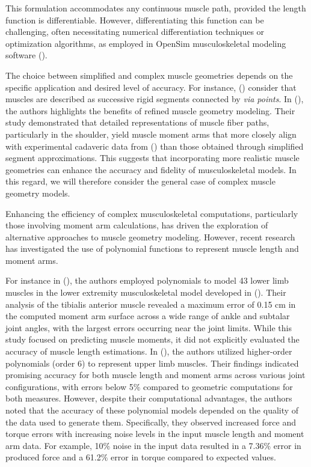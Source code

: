 This formulation accommodates any continuous muscle path, provided the length function is differentiable. However, differentiating this function can be challenging, often necessitating numerical differentiation techniques or optimization algorithms, as employed in OpenSim musculoskeletal modeling software (\cite{delpOpenSimOpenSourceSoftware2007}).

The choice between simplified and complex muscle geometries depends on the specific application and desired level of accuracy. For instance, (\cite{livetAutomaticSimplifiedApproach2022}) consider that muscles are described as successive rigid segments connected by \emph{via points}. In (\cite{kedadriaShoulderMusculoskeletalModel2023}), the authors highlights the benefits of refined muscle geometry modeling. Their study demonstrated that detailed representations of muscle fiber paths, particularly in the shoulder, yield muscle moment arms that more closely align with experimental cadaveric data from (\cite{acklandMomentArmsMuscles2008}) than those obtained through simplified segment approximations. This suggests that incorporating more realistic muscle geometries can enhance the accuracy and fidelity of musculoskeletal models. In this regard, we will therefore consider the general case of complex muscle geometry models.

Enhancing the efficiency of complex musculoskeletal computations, particularly those involving moment arm calculations, has driven the exploration of alternative approaches to muscle geometry modeling. However, recent research has investigated the use of polynomial functions to represent muscle length and moment arms.

For instance in (\cite{menegaldoMomentArmsMusculotendon2004}), the authors employed polynomials to model 43 lower limb muscles in the lower extremity musculoskeletal model developed in (\cite{delpInteractiveGraphicsbasedModel1990a}). Their analysis of the tibialis anterior muscle revealed a maximum error of 0.15 cm in the computed moment arm surface across a wide range of ankle and subtalar joint angles, with the largest errors occurring near the joint limits.  While this study focused on predicting muscle moments, it did not explicitly evaluated the accuracy of muscle length estimations.
In (\cite{sobinovApproximatingComplexMusculoskeletal2020}), the authors utilized higher-order polynomials (order 6) to represent upper limb muscles. Their findings indicated promising accuracy for both muscle length and moment arms across various joint configurations, with errors below 5$\%$ compared to geometric computations for both measures. However, despite their computational advantages, the authors noted that the accuracy of these polynomial models depended on the quality of the data used to generate them. Specifically, they observed increased force and torque errors with increasing noise levels in the input muscle length and moment arm data. For example, 10$\%$ noise in the input data resulted in a 7.36$\%$ error in produced force and a 61.2$\%$ error in torque compared to expected values.

